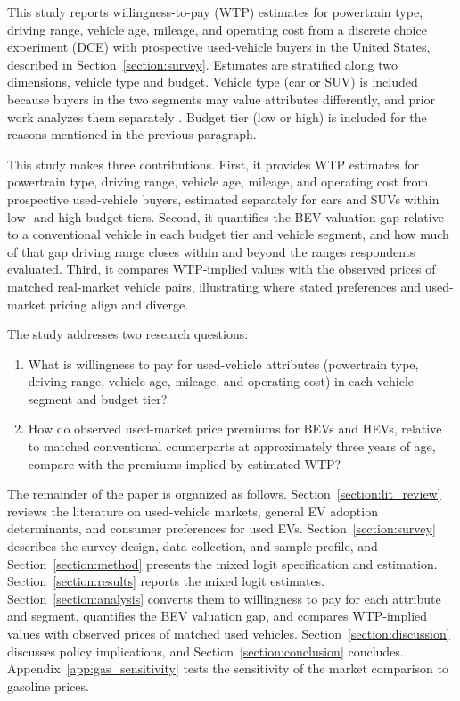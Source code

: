 \documentclass[a4paper,fleqn]{cas-sc}   %
\begin{document}
This study reports willingness-to-pay (WTP) estimates for powertrain type, driving range, vehicle age, mileage, and operating cost from a discrete choice experiment (DCE) with prospective used-vehicle buyers in the United States, described in Section~\ref{section:survey}. Estimates are stratified along two dimensions, vehicle type and budget. Vehicle type (car or SUV) is included because buyers in the two segments may value attributes differently, and prior work analyzes them separately \parencite{forsytheDrivingElectricVehicle}. Budget tier (low or high) is included for the reasons mentioned in the previous paragraph.

This study makes three contributions. First, it provides WTP estimates for powertrain type, driving range, vehicle age, mileage, and operating cost from prospective used-vehicle buyers, estimated separately for cars and SUVs within low- and high-budget tiers. Second, it quantifies the BEV valuation gap relative to a conventional vehicle in each budget tier and vehicle segment, and how much of that gap driving range closes within and beyond the ranges respondents evaluated. Third, it compares WTP-implied values with the observed prices of matched real-market vehicle pairs, illustrating where stated preferences and used-market pricing align and diverge.

The study addresses two research questions:
\begin{enumerate}
\item What is willingness to pay for used-vehicle attributes (powertrain type, driving range, vehicle age, mileage, and operating cost) in each vehicle segment and budget tier?
\item How do observed used-market price premiums for BEVs and HEVs, relative to matched conventional counterparts at approximately three years of age, compare with the premiums implied by estimated WTP?
\end{enumerate}

The remainder of the paper is organized as follows. Section~\ref{section:lit_review} reviews the literature on used-vehicle markets, general EV adoption determinants, and consumer preferences for used EVs. Section~\ref{section:survey} describes the survey design, data collection, and sample profile, and Section~\ref{section:method} presents the mixed logit specification and estimation. Section~\ref{section:results} reports the mixed logit estimates. Section~\ref{section:analysis} converts them to willingness to pay for each attribute and segment, quantifies the BEV valuation gap, and compares WTP-implied values with observed prices of matched used vehicles. Section~\ref{section:discussion} discusses policy implications, and Section~\ref{section:conclusion} concludes. Appendix~\ref{app:gas_sensitivity} tests the sensitivity of the market comparison to gasoline prices.
\end{document}
